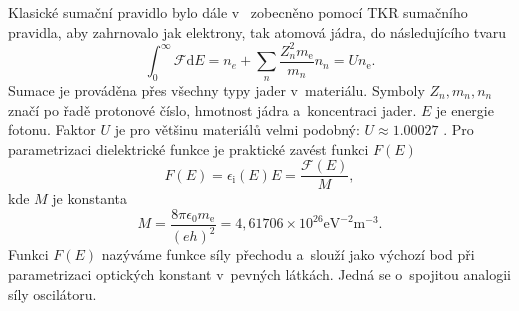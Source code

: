 Klasické sumační pravidlo bylo dále v~\cite{sumrule} zobecněno pomocí TKR sumačního pra\-vid\-la, aby zahrnovalo jak elektrony, tak atomová jádra, do následujícího tvaru
\begin{equation}
\int_0^\infty \mathcal{F} \mathrm{d}E = n_e + \sum_n \frac{Z_n^2 m_\mathrm{e}} {m_n} n_n = U n_\mathrm{e} \mathrm{.}
\label{density}
\end{equation}
Sumace je prováděna přes všechny typy jader v~materiálu. Symboly $Z_n, m_n, n_n$ značí po řadě protonové číslo, hmotnost jádra a~koncentraci jader. $E$ je energie fotonu. Faktor $U$ je pro většinu materiálů velmi podobný: $U \approx 1.00027$ \cite{sumrule}.
%
Pro parametrizaci dielektrické funkce je praktické zavést funkci $F(E)$
\begin{equation}
F(E) = \epsilon_\mathrm{i}(E) E = \frac{\mathcal{F}(E)}{M}\mathrm{,}
\end{equation}  
kde $M$ je konstanta
\begin{equation} 
M = \frac{8 \pi \epsilon_0 m_\mathrm{e}}{(e h)^2} = 4,61706\times10^{26} \mathrm{eV}^{-2}\mathrm{m}^{-3} \mathrm{.}
\end{equation}
%
Funkci $F(E)$ nazýváme funkce síly přechodu a~slouží jako výchozí bod při parametrizaci optických konstant v~pevných látkách. Jedná se o~spojitou analogii síly oscilátoru.

